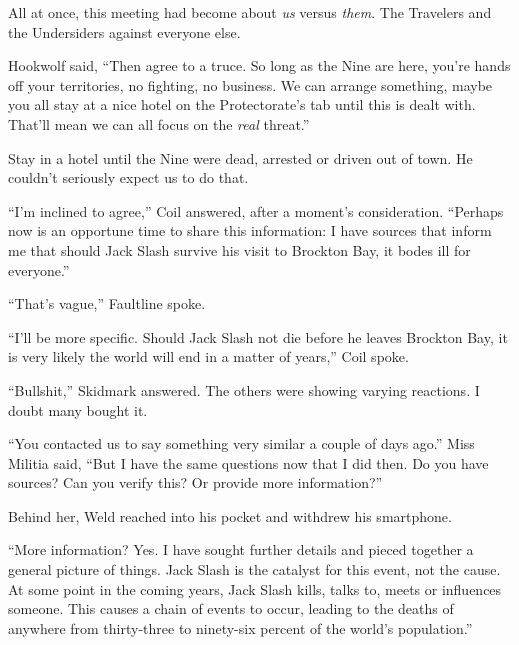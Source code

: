All at once, this meeting had become about \emph{us} versus \emph{them}.  The Travelers and the Undersiders against everyone else.



Hookwolf said, ``Then agree to a truce.  So long as the Nine are here, you're hands off your territories, no fighting, no business.  We can arrange something, maybe you all stay at a nice hotel on the Protectorate's tab until this is dealt with.  That'll mean we can all focus on the \emph{real} threat.''



Stay in a hotel until the Nine were dead, arrested or driven out of town.  He couldn't seriously expect us to do that.



``I'm inclined to agree,'' Coil answered, after a moment's consideration.  ``Perhaps now is an opportune time to share this information:  I have sources that inform me that should Jack Slash survive his visit to Brockton Bay, it bodes ill for everyone.''



``That's vague,'' Faultline spoke.



``I'll be more specific.  Should Jack Slash not die before he leaves Brockton Bay, it is very likely the world will end in a matter of years,'' Coil spoke.



``Bullshit,'' Skidmark answered.  The others were showing varying reactions.  I doubt many bought it.



``You contacted us to say something very similar a couple of days ago.'' Miss Militia said, ``But I have the same questions now that I did then.  Do you have sources?  Can you verify this?  Or provide more information?''



Behind her, Weld reached into his pocket and withdrew his smartphone.



``More information?  Yes.  I have sought further details and pieced together a general picture of things.  Jack Slash is the catalyst for this event, not the cause.  At some point in the coming years, Jack Slash kills, talks to, meets or influences someone.  This causes a chain of events to occur, leading to the deaths of anywhere from thirty-three to ninety-six percent of the world's population.''



